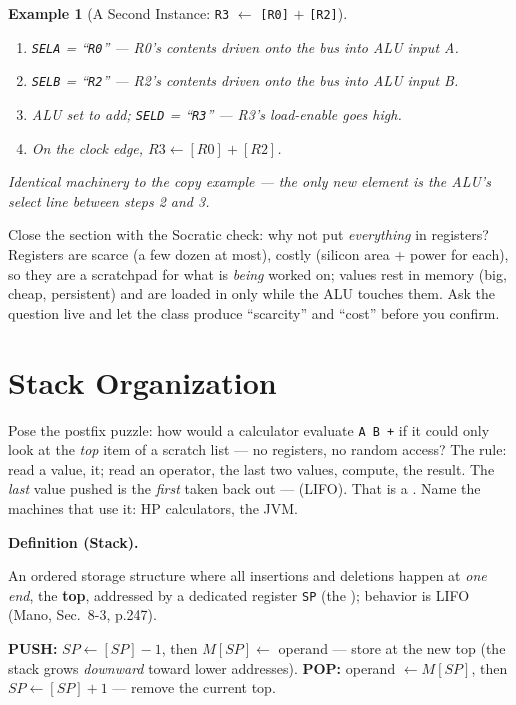\documentclass[11pt]{article}
\newtheorem{example}{Example}[section]
\newenvironment{definitionbox}[1]{%
  \par\noindent\textbf{Definition (#1).}\ \itshape
}{\par\vspace{0.3em}}
\begin{document}
\begin{example}[A Second Instance: \texttt{R3} $\gets$ \texttt{[R0]} $+$ \texttt{[R2]}]
\begin{enumerate}
  \item \texttt{SELA} = ``\texttt{R0}'' --- R0's contents driven onto the bus into ALU input A.
  \item \texttt{SELB} = ``\texttt{R2}'' --- R2's contents driven onto the bus into ALU input B.
  \item ALU set to add; \texttt{SELD} = ``\texttt{R3}'' --- R3's load-enable goes high.
  \item On the clock edge, $R3 \gets [R0]+[R2]$.
\end{enumerate}
Identical machinery to the copy example --- the only new element is the ALU's select line between steps 2 and 3.
\end{example}

Close the section with the Socratic check: why not put \emph{everything} in registers? Registers are scarce (a few dozen at most), costly (silicon area + power for each), so they are a scratchpad for what is \emph{being} worked on; values rest in memory (big, cheap, persistent) and are loaded in only while the ALU touches them. Ask the question live and let the class produce ``scarcity'' and ``cost'' before you confirm.

\section{Stack Organization}

Pose the postfix puzzle: how would a calculator evaluate \texttt{A B +} if it could only look at the \emph{top} item of a scratch list --- no registers, no random access? The rule: read a value,  it; read an operator,  the last two values, compute,  the result. The \emph{last} value pushed is the \emph{first} taken back out ---  (LIFO). That is a . Name the machines that use it: HP calculators, the JVM.

\begin{definitionbox}{Stack}
An ordered storage structure where all insertions and deletions happen at \emph{one end}, the \textbf{top}, addressed by a dedicated register \texttt{SP} (the ); behavior is LIFO (Mano, Sec.~8-3, p.247).
\end{definitionbox}

\textbf{PUSH:} $SP \gets [SP] - 1$, then $M[SP] \gets$ operand --- store at the new top (the stack grows \emph{downward} toward lower addresses). \textbf{POP:} operand $\gets M[SP]$, then $SP \gets [SP] + 1$ --- remove the current top.
\end{document}
